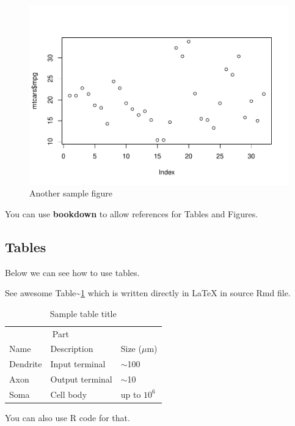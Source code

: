 \documentclass{article}
\begin{document}
\begin{figure}
\centering
\includegraphics{Untitled_files/figure-latex/fig2-1.pdf}
\caption{Another sample figure}
\end{figure}

You can use \textbf{bookdown} to allow references for Tables and
Figures.

\hypertarget{tables}{%
\subsection{Tables}\label{tables}}

Below we can see how to use tables.

See awesome Table\textasciitilde{}\ref{tab:table} which is written
directly in LaTeX in source Rmd file.

\begin{table}
 \caption{Sample table title}
  \centering
  \begin{tabular}{lll}
    \toprule
    \multicolumn{2}{c}{Part}                   \\
    \cmidrule(r){1-2}
    Name     & Description     & Size ($\mu$m) \\
    \midrule
    Dendrite & Input terminal  & $\sim$100     \\
    Axon     & Output terminal & $\sim$10      \\
    Soma     & Cell body       & up to $10^6$  \\
    \bottomrule
  \end{tabular}
  \label{tab:table}
\end{table}

You can also use R code for that.
\end{document}
